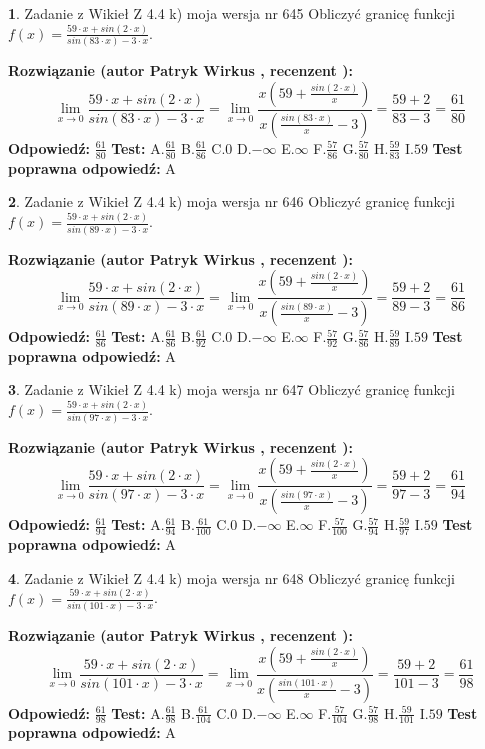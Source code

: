 \documentclass[12pt, a4paper]{article}
\theoremstyle{definition} %
\newtheorem{zad}{}
\newcommand{\zadStart}[1]{\begin{zad}#1\newline}
\newcommand{\zadStop}{\end{zad}}
\newcommand{\rozwStart}[2]{\noindent \textbf{Rozwiązanie (autor #1 , recenzent #2): }\newline}
\newcommand{\rozwStop}{\newline}
\newcommand{\odpStart}{\noindent \textbf{Odpowiedź:}\newline}
\newcommand{\odpStop}{\newline}
\newcommand{\testStart}{\noindent \textbf{Test:}\newline}
\newcommand{\testStop}{\newline}
\newcommand{\kluczStart}{\noindent \textbf{Test poprawna odpowiedź:}\newline}
\newcommand{\kluczStop}{\newline}
\begin{document}
\zadStart{Zadanie z Wikieł Z 4.4 k) moja wersja nr 645}
Obliczyć granicę funkcji $f(x)=\frac{59\cdot x +sin(2\cdot x)}{sin(83\cdot x) -3\cdot x}$.
\zadStop
\rozwStart{Patryk Wirkus}{}
$$\lim\limits_{x\to 0}\frac{59\cdot x +sin(2\cdot x)}{sin(83\cdot x) -3\cdot x}
=\lim\limits_{x\to 0}\frac{x(59+\frac{sin(2\cdot x)}{x})}{x(\frac{sin(83\cdot x)}{x}-3)}
=\frac{59+2}{83-3} = \frac{61}{80}$$
\rozwStop
\odpStart
$\frac{61}{80}$
\odpStop
\testStart
A.$\frac{61}{80}$
B.$\frac{61}{86}$
C.$0$
D.$-\infty$
E.$\infty$
F.$\frac{57}{86}$
G.$\frac{57}{80}$
H.$\frac{59}{83}$
I.$59$
\testStop
\kluczStart
A
\kluczStop



\zadStart{Zadanie z Wikieł Z 4.4 k) moja wersja nr 646}
Obliczyć granicę funkcji $f(x)=\frac{59\cdot x +sin(2\cdot x)}{sin(89\cdot x) -3\cdot x}$.
\zadStop
\rozwStart{Patryk Wirkus}{}
$$\lim\limits_{x\to 0}\frac{59\cdot x +sin(2\cdot x)}{sin(89\cdot x) -3\cdot x}
=\lim\limits_{x\to 0}\frac{x(59+\frac{sin(2\cdot x)}{x})}{x(\frac{sin(89\cdot x)}{x}-3)}
=\frac{59+2}{89-3} = \frac{61}{86}$$
\rozwStop
\odpStart
$\frac{61}{86}$
\odpStop
\testStart
A.$\frac{61}{86}$
B.$\frac{61}{92}$
C.$0$
D.$-\infty$
E.$\infty$
F.$\frac{57}{92}$
G.$\frac{57}{86}$
H.$\frac{59}{89}$
I.$59$
\testStop
\kluczStart
A
\kluczStop



\zadStart{Zadanie z Wikieł Z 4.4 k) moja wersja nr 647}
Obliczyć granicę funkcji $f(x)=\frac{59\cdot x +sin(2\cdot x)}{sin(97\cdot x) -3\cdot x}$.
\zadStop
\rozwStart{Patryk Wirkus}{}
$$\lim\limits_{x\to 0}\frac{59\cdot x +sin(2\cdot x)}{sin(97\cdot x) -3\cdot x}
=\lim\limits_{x\to 0}\frac{x(59+\frac{sin(2\cdot x)}{x})}{x(\frac{sin(97\cdot x)}{x}-3)}
=\frac{59+2}{97-3} = \frac{61}{94}$$
\rozwStop
\odpStart
$\frac{61}{94}$
\odpStop
\testStart
A.$\frac{61}{94}$
B.$\frac{61}{100}$
C.$0$
D.$-\infty$
E.$\infty$
F.$\frac{57}{100}$
G.$\frac{57}{94}$
H.$\frac{59}{97}$
I.$59$
\testStop
\kluczStart
A
\kluczStop



\zadStart{Zadanie z Wikieł Z 4.4 k) moja wersja nr 648}
Obliczyć granicę funkcji $f(x)=\frac{59\cdot x +sin(2\cdot x)}{sin(101\cdot x) -3\cdot x}$.
\zadStop
\rozwStart{Patryk Wirkus}{}
$$\lim\limits_{x\to 0}\frac{59\cdot x +sin(2\cdot x)}{sin(101\cdot x) -3\cdot x}
=\lim\limits_{x\to 0}\frac{x(59+\frac{sin(2\cdot x)}{x})}{x(\frac{sin(101\cdot x)}{x}-3)}
=\frac{59+2}{101-3} = \frac{61}{98}$$
\rozwStop
\odpStart
$\frac{61}{98}$
\odpStop
\testStart
A.$\frac{61}{98}$
B.$\frac{61}{104}$
C.$0$
D.$-\infty$
E.$\infty$
F.$\frac{57}{104}$
G.$\frac{57}{98}$
H.$\frac{59}{101}$
I.$59$
\testStop
\kluczStart
A
\kluczStop
\end{document}
